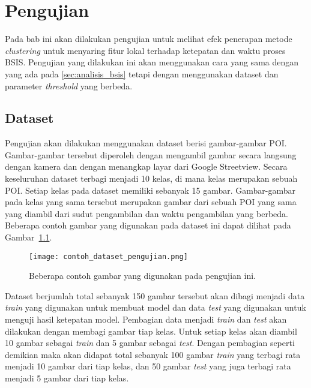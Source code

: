 \chapter{Pengujian}

Pada bab ini akan dilakukan pengujian untuk melihat efek penerapan metode \textit{clustering} untuk menyaring fitur lokal terhadap ketepatan dan waktu proses BSIS. Pengujian yang dilakukan ini akan menggunakan cara yang sama dengan yang ada pada \ref{sec:analisis_bsis} tetapi dengan menggunakan dataset dan parameter \textit{threshold} yang berbeda. 

\section{Dataset} 
Pengujian akan dilakukan menggunakan dataset berisi gambar-gambar POI. Gambar-gambar tersebut diperoleh dengan mengambil gambar secara langsung dengan kamera dan dengan menangkap layar dari Google Streetview. Secara keseluruhan dataset terbagi menjadi 10 kelas, di mana kelas merupakan sebuah POI. Setiap kelas pada dataset memiliki sebanyak 15 gambar. Gambar-gambar pada kelas yang sama tersebut merupakan gambar dari sebuah POI yang sama yang diambil dari sudut pengambilan dan waktu pengambilan yang berbeda. Beberapa contoh gambar yang digunakan pada dataset ini dapat dilihat pada Gambar~\ref{fig:contoh_dataset_pengujian}.
\begin{figure}[H]
	\centering
	\texttt{[image: contoh\_dataset\_pengujian.png]}
	\caption{Beberapa contoh gambar yang digunakan pada pengujian ini.}
	\label{fig:contoh_dataset_pengujian}
\end{figure}

Dataset berjumlah total sebanyak 150 gambar tersebut akan dibagi menjadi data \textit{train} yang digunakan untuk membuat model dan data \textit{test} yang digunakan untuk menguji hasil ketepatan model. Pembagian data menjadi \textit{train} dan \textit{test} akan dilakukan dengan membagi gambar tiap kelas. Untuk setiap kelas akan diambil 10 gambar sebagai \textit{train} dan 5 gambar sebagai \textit{test}. Dengan pembagian seperti demikian maka akan didapat total sebanyak 100 gambar \textit{train} yang terbagi rata menjadi 10 gambar dari tiap kelas, dan 50 gambar \textit{test} yang juga terbagi rata menjadi 5 gambar dari tiap kelas.